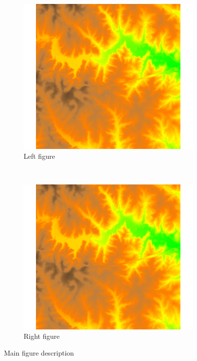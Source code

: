\documentclass[10pt]{article}
\newcommand{\twoimgwidth}{0.45\textwidth}
\begin{document}
\begin{figure}[htbp]
  \centering
  \begin{subfigure}[b]{\twoimgwidth}
    \includegraphics[width=\textwidth]{report_template_image}
    \caption{Left figure}
  \end{subfigure}%
  ~ %
  \begin{subfigure}[b]{\twoimgwidth}
    \includegraphics[width=\textwidth]{report_template_image}
    \caption{Right figure}
  \end{subfigure}
  \caption{Main figure description}
  \label{fig:twotwo}
\end{figure}
\end{document}
